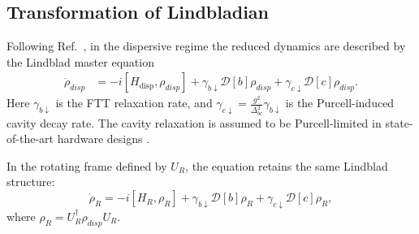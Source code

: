 \subsection{Transformation of Lindbladian}

Following Ref.~\cite{Blais2021}, in the dispersive regime the reduced dynamics are described by the Lindblad master equation
\begin{align}
\label{Linblad}
    \dot{ \rho}_\textit{disp} &= -i[H_{\text{disp}},  \rho_\textit{disp}] + \gamma_{b\downarrow} \mathcal{D}[b] \rho_\textit{disp} + \gamma_{c\downarrow} \mathcal{D}[c]  \rho_\textit{disp}.
\end{align}
Here $\gamma_{b\downarrow}$ is the FTT relaxation rate, and $\gamma_{c\downarrow}=\frac{g^2}{\Delta_{bc}^2}\gamma_{b\downarrow}$ is the Purcell-induced cavity decay rate. The cavity relaxation is assumed to be Purcell-limited in state-of-the-art hardware designs \cite{longcoherence5}.

In the rotating frame defined by $U_R$, the equation retains the same Lindblad structure:
\begin{equation}
\label{LinbadR}
    \dot{\rho}_R = -i[H_R, \rho_R] + \gamma_{b\downarrow} \mathcal{D}[b]\rho_R + \gamma_{c\downarrow} \mathcal{D}[c]\rho_R,
\end{equation}
where ${\rho}_R = U_R^\dagger \rho_\textit{disp}U_R$.

